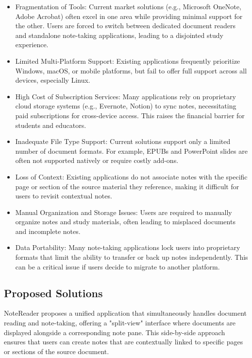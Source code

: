 \begin{itemize}
    \item Fragmentation of Tools: Current market solutions (e.g., Microsoft OneNote, Adobe Acrobat) often excel in one area while providing minimal support for the other. Users are forced to switch between dedicated document readers and standalone note-taking applications, leading to a disjointed study experience.
    \item Limited Multi-Platform Support: Existing applications frequently prioritize Windows, macOS, or mobile platforms, but fail to offer full support across all devices, especially Linux.
    \item High Cost of Subscription Services: Many applications rely on proprietary cloud storage systems (e.g., Evernote, Notion) to sync notes, necessitating paid subscriptions for cross-device access. This raises the financial barrier for students and educators.
    \item Inadequate File Type Support: Current solutions support only a limited number of document formats. For example, EPUBs and PowerPoint slides are often not supported natively or require costly add-ons.
    \item Loss of Context: Existing applications do not associate notes with the specific page or section of the source material they reference, making it difficult for users to revisit contextual notes.
    \item Manual Organization and Storage Issues: Users are required to manually organize notes and study materials, often leading to misplaced documents and incomplete notes.
    \item Data Portability: Many note-taking applications lock users into proprietary formats that limit the ability to transfer or back up notes independently. This can be a critical issue if users decide to migrate to another platform.
\end{itemize}

\subsection{Proposed Solutions}
NoteReader proposes a unified application that simultaneously handles document reading and note-taking, offering a "split-view" interface where documents are displayed alongside a corresponding note pane. This side-by-side approach ensures that users can create notes that are contextually linked to specific pages or sections of the source document.

